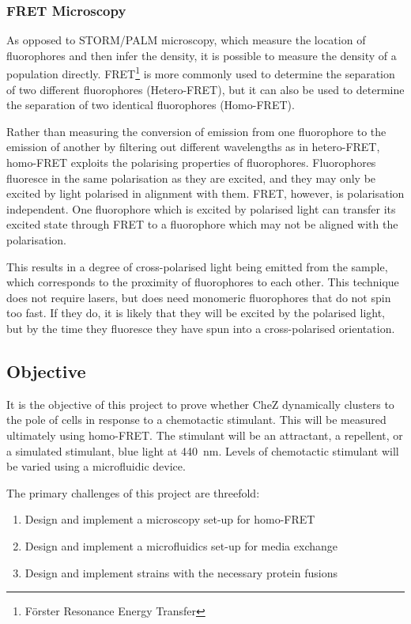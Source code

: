 \documentclass[../main.tex]{subfiles}
\begin{document}
\subsubsection{FRET Microscopy}
As opposed to STORM/PALM microscopy, which measure the location of fluorophores and then infer the density, it is possible to measure the density of a population directly. FRET\footnote{F\"orster Resonance Energy Transfer} is more commonly used to determine the separation of two different fluorophores (Hetero-FRET), but it can also be used to determine the separation of two identical fluorophores (Homo-FRET).

Rather than measuring the conversion of emission from one fluorophore to the emission of another by filtering out different wavelengths as in hetero-FRET, homo-FRET exploits the polarising properties of fluorophores. Fluorophores fluoresce in the same polarisation as they are excited, and they may only be excited by light polarised in alignment with them. FRET, however, is polarisation independent. One fluorophore which is excited by polarised light can transfer its excited state through FRET to a fluorophore which may not be aligned with the polarisation. 

This results in a degree of cross-polarised light being emitted from the sample, which corresponds to the proximity of fluorophores to each other. This technique does not require lasers, but does need monomeric fluorophores that do not spin too fast. If they do, it is likely that they will be excited by the polarised light, but by the time they fluoresce they have spun into a cross-polarised orientation.

\subsection{Objective}
It is the objective of this project to prove whether CheZ dynamically clusters to the pole of \ecoli cells in response to a chemotactic stimulant. This will be measured ultimately using homo-FRET. The stimulant will be an attractant, a repellent, or a simulated stimulant, blue light at \SI{440}{\nano\meter}\cite{wright06}. Levels of chemotactic stimulant will be varied using a microfluidic device.

The primary challenges of this project are threefold:
\begin{enumerate}
\item Design and implement a microscopy set-up for homo-FRET
\item Design and implement a microfluidics set-up for media exchange
\item Design and implement \ecoli strains with the necessary protein fusions
\end{enumerate}
\end{document}
